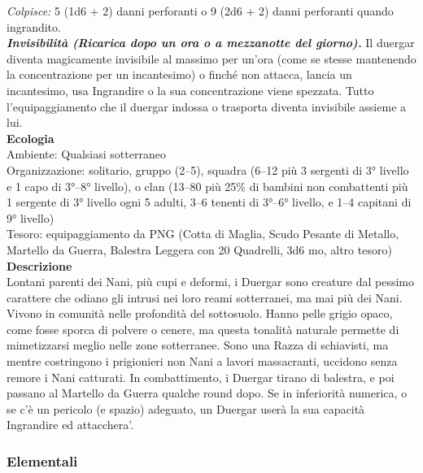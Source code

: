 \begin{multicols}{2}
\emph{Colpisce:} 5 (1d6 + 2) danni perforanti o 9 (2d6 + 2) danni perforanti quando ingrandito.\\
\emph{\textbf{Invisibilità (Ricarica dopo un ora o a mezzanotte del giorno).}} Il duergar diventa magicamente invisibile al massimo per un'ora (come se stesse mantenendo la concentrazione per un incantesimo) o finché non attacca, lancia un incantesimo, usa Ingrandire o la sua concentrazione viene spezzata. Tutto l'equipaggiamento che il duergar indossa o trasporta diventa invisibile assieme a lui.\\
\textbf{Ecologia}\\
Ambiente: Qualsiasi sotterraneo\\
Organizzazione: solitario, gruppo (2–5), squadra (6–12 più 3 sergenti di 3° livello e 1 capo di 3°–8° livello), o clan (13–80 più 25\% di bambini non combattenti più 1 sergente di 3° livello ogni 5 adulti, 3–6 tenenti di 3°–6° livello, e 1–4 capitani di 9° livello)\\
Tesoro: equipaggiamento da PNG (Cotta di Maglia, Scudo Pesante di Metallo, Martello da Guerra, Balestra Leggera con 20 Quadrelli, 3d6 mo, altro tesoro)\\
\textbf{Descrizione}\\
Lontani parenti dei Nani, più cupi e deformi, i Duergar sono creature dal pessimo carattere che odiano gli intrusi nei loro reami sotterranei, ma mai più dei Nani. Vivono in comunità nelle profondità del sottosuolo. Hanno pelle grigio opaco, come fosse sporca di polvere o cenere, ma questa tonalità naturale permette di mimetizzarsi meglio nelle zone sotterranee. Sono una Razza di schiavisti, ma mentre costringono i prigionieri non Nani a lavori massacranti, uccidono senza remore i Nani catturati. In combattimento, i Duergar tirano di balestra, e poi passano al Martello da Guerra qualche round dopo. Se in inferiorità numerica, o se c’è un pericolo (e spazio) adeguato, un Duergar userà la sua capacità Ingrandire ed attacchera'.


\subsubsection{Elementali}


\end{multicols}
